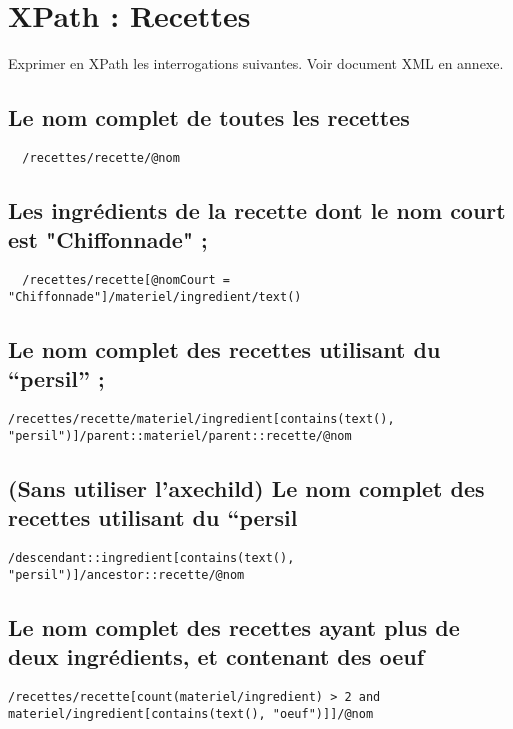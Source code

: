 \chapter{XPath : Recettes}
Exprimer en XPath les interrogations suivantes.
Voir document XML en annexe.

\section{Le nom complet de toutes les recettes}
\begin{verbatim}
  /recettes/recette/@nom
\end{verbatim}

\section{Les ingrédients de la recette dont le nom court est "Chiffonnade" ;}
\begin{verbatim}
  /recettes/recette[@nomCourt = "Chiffonnade"]/materiel/ingredient/text()
\end{verbatim}

\section{Le nom complet des recettes utilisant du “persil” ;}
\begin{verbatim}
/recettes/recette/materiel/ingredient[contains(text(), "persil")]/parent::materiel/parent::recette/@nom
\end{verbatim}

\section{(Sans utiliser l’axechild) Le nom complet des recettes utilisant du “persil}
\begin{verbatim}
/descendant::ingredient[contains(text(), "persil")]/ancestor::recette/@nom
\end{verbatim}

\section{Le nom complet des recettes ayant plus de deux ingrédients, et contenant des oeuf}
\begin{verbatim}
/recettes/recette[count(materiel/ingredient) > 2 and materiel/ingredient[contains(text(), "oeuf")]]/@nom
\end{verbatim}

